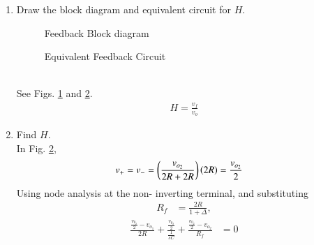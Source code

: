 \begin{enumerate}[label=\arabic*.,ref=\theenumi]
\item Draw the block diagram and equivalent circuit for $H$.
\renewcommand{\thefigure}{\theenumi.\arabic{figure}}
\begin{figure}[!ht]
	\begin{center}
		\resizebox{\columnwidth}{!}{}
	\end{center}
\caption{Feedback Block diagram}
\label{fig:es17btech11009_b3}
\end{figure}
\begin{figure}[!ht]
	\begin{center}
		\resizebox{\columnwidth}{!}{}
	\end{center}
\caption{Equivalent Feedback Circuit}
\label{fig:es17btech11009_fig3}
\end{figure}
\renewcommand{\thefigure}{\theenumi}
\\
\solution See Figs. \ref{fig:es17btech11009_b3} and \ref{fig:es17btech11009_fig3}.
\begin{align}
    H = \frac{v_{f}}{v_{o}}
\end{align}
\item Find $H$.
\\
\solution In Fig. \ref{fig:es17btech11009_fig3},
\begin{align}
v_{+}&= v_{-}=\left(\frac{v_{o_2}}{2R + 2R}\right)\left(2R\right) = \frac{v_{o_2}}{2}
\end{align}
%
Using node analysis at the non- inverting terminal, and substituting 
\begin{align}
R_{f} &= \frac{2R}{1 + \Delta},
\label{eq:es17btech11009_Rf}
\end{align}
\begin{align}
\frac{\frac{v_{0_2}}{2} - v_{o_1}}{2R} + \frac{\frac{v_{0_2}}{2}}{\frac{1}{sC}} + \frac{\frac{v_{0_2}}{2} - v_{o_2}}{R_{f}} &=0
\\

\end{align}
\end{enumerate}
